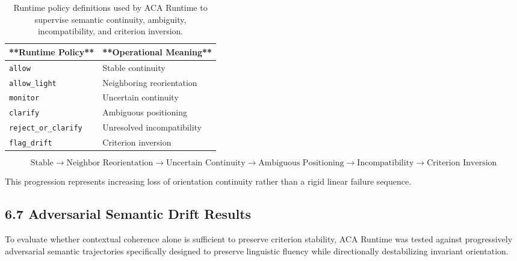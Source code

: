 \documentclass[11pt]{article}
\begin{document}
\begin{table}[h]

\centering

\begin{tabular}{ll}

\hline

**Runtime Policy** & **Operational Meaning** \\

\hline

\texttt{allow} & Stable continuity \\

\texttt{allow\_light} & Neighboring reorientation \\

\texttt{monitor} & Uncertain continuity \\

\texttt{clarify} & Ambiguous positioning \\

\texttt{reject\_or\_clarify} & Unresolved incompatibility \\

\texttt{flag\_drift} & Criterion inversion \\

\hline

\end{tabular}

\caption{Runtime policy definitions used by ACA Runtime to supervise semantic continuity, ambiguity, incompatibility, and criterion inversion.}

\label{tab:runtime-policy-definitions}

\end{table}

$$
\text{Stable}
\rightarrow
\text{Neighbor Reorientation}
\rightarrow
\text{Uncertain Continuity}
\rightarrow
\text{Ambiguous Positioning}
\rightarrow
\text{Incompatibility}
\rightarrow
\text{Criterion Inversion}
$$

This progression represents increasing loss of orientation continuity rather than a rigid linear failure sequence.

\subsection{6.7 Adversarial Semantic Drift Results}

To evaluate whether contextual coherence alone is sufficient to preserve criterion stability, ACA Runtime was tested against progressively adversarial semantic trajectories specifically designed to preserve linguistic fluency while directionally destabilizing invariant orientation.
\end{document}
